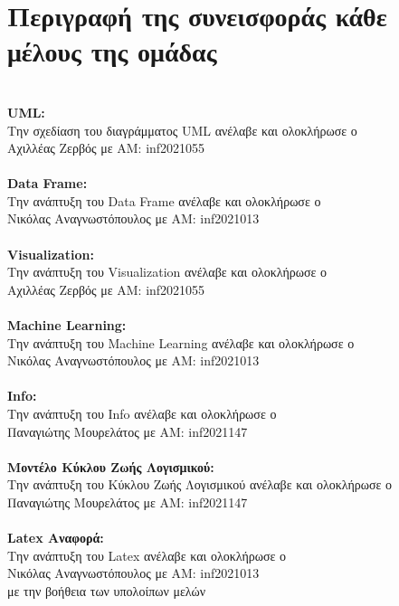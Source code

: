 \documentclass[a4paper,12pt]{article}
\begin{document}
\newpage

\section{Περιγραφή της συνεισφοράς κάθε μέλους της ομάδας}

\\

\textbf{UML:}\\
Την σχεδίαση του διαγράμματος UML ανέλαβε και ολοκλήρωσε ο \\Αχιλλέας Ζερβός με ΑΜ: inf2021055
\\
\\
\textbf{Data Frame:}\\
Την ανάπτυξη του Data Frame ανέλαβε και ολοκλήρωσε ο\\ Νικόλας Αναγνωστόπουλος με ΑΜ: inf2021013
\\\\
\textbf{Visualization:}\\
Την ανάπτυξη του Visualization ανέλαβε και ολοκλήρωσε ο \\ Αχιλλέας Ζερβός με ΑΜ: inf2021055
\\\\
\textbf{Machine Learning:}\\
Την ανάπτυξη του Machine Learning ανέλαβε και ολοκλήρωσε ο \\ Νικόλας Αναγνωστόπουλος με ΑΜ: inf2021013
\\\\
\textbf{Info:}\\
Την ανάπτυξη του Info ανέλαβε και ολοκλήρωσε ο \\ Παναγιώτης Μουρελάτος με ΑΜ: inf2021147
\\\\
\textbf{Μοντέλο Κύκλου Ζωής Λογισμικού:}\\
Την ανάπτυξη του Κύκλου Ζωής Λογισμικού ανέλαβε και ολοκλήρωσε ο \\Παναγιώτης Μουρελάτος με ΑΜ: inf2021147
\\\\
\textbf{Latex Αναφορά:}\\
Την ανάπτυξη του Latex ανέλαβε και ολοκλήρωσε ο \\ Νικόλας Αναγνωστόπουλος με ΑΜ: inf2021013 \\ με την βοήθεια των υπολοίπων μελών 
\end{document}
